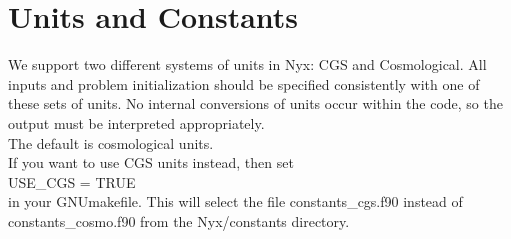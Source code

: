\section{Units and Constants}

We support two different systems of units in Nyx: CGS and Cosmological.
All inputs and problem initialization should be specified consistently with one of these sets of units.  
No internal conversions of units occur within the code, so the output must be interpreted appropriately. \\

\noindent The default is cosmological units. \\

\noindent If you want to use CGS units instead, then set \\

\noindent USE\_CGS = TRUE  \\

\noindent in your GNUmakefile.  This will select the file constants\_cgs.f90 instead of constants\_cosmo.f90 from the
Nyx/constants directory. 

